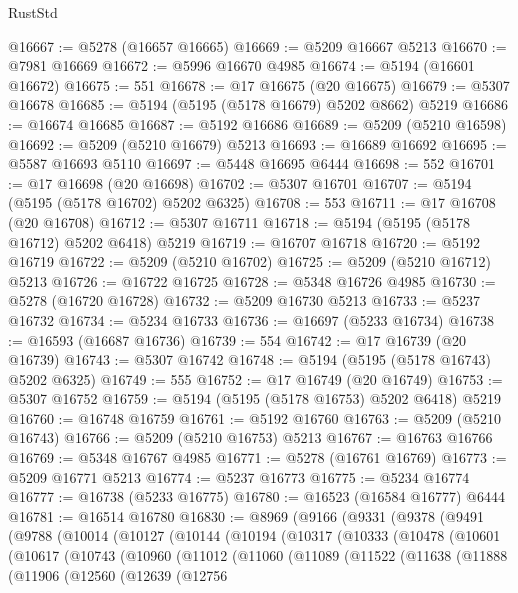 \begin{lexlean}{RustStd}
\begin{coremodule}
@16667 := @5278 (@16657 @16665)
@16669 := @5209 @16667 @5213
@16670 := @7981 @16669
@16672 := @5996 @16670 @4985
@16674 := @5194 (@16601 @16672)
@16675 := 551
@16678 := @17 @16675 (@20 @16675)
@16679 := @5307 @16678
@16685 := @5194 (@5195 (@5178 @16679) @5202 @8662) @5219
@16686 := @16674 @16685
@16687 := @5192 @16686
@16689 := @5209 (@5210 @16598)
@16692 := @5209 (@5210 @16679) @5213
@16693 := @16689 @16692
@16695 := @5587 @16693 @5110
@16697 := @5448 @16695 @6444
@16698 := 552
@16701 := @17 @16698 (@20 @16698)
@16702 := @5307 @16701
@16707 := @5194 (@5195 (@5178 @16702) @5202 @6325)
@16708 := 553
@16711 := @17 @16708 (@20 @16708)
@16712 := @5307 @16711
@16718 := @5194 (@5195 (@5178 @16712) @5202 @6418) @5219
@16719 := @16707 @16718
@16720 := @5192 @16719
@16722 := @5209 (@5210 @16702)
@16725 := @5209 (@5210 @16712) @5213
@16726 := @16722 @16725
@16728 := @5348 @16726 @4985
@16730 := @5278 (@16720 @16728)
@16732 := @5209 @16730 @5213
@16733 := @5237 @16732
@16734 := @5234 @16733
@16736 := @16697 (@5233 @16734)
@16738 := @16593 (@16687 @16736)
@16739 := 554
@16742 := @17 @16739 (@20 @16739)
@16743 := @5307 @16742
@16748 := @5194 (@5195 (@5178 @16743) @5202 @6325)
@16749 := 555
@16752 := @17 @16749 (@20 @16749)
@16753 := @5307 @16752
@16759 := @5194 (@5195 (@5178 @16753) @5202 @6418) @5219
@16760 := @16748 @16759
@16761 := @5192 @16760
@16763 := @5209 (@5210 @16743)
@16766 := @5209 (@5210 @16753) @5213
@16767 := @16763 @16766
@16769 := @5348 @16767 @4985
@16771 := @5278 (@16761 @16769)
@16773 := @5209 @16771 @5213
@16774 := @5237 @16773
@16775 := @5234 @16774
@16777 := @16738 (@5233 @16775)
@16780 := @16523 (@16584 @16777) @6444
@16781 := @16514 @16780
@16830 := @8969
    (@9166
      (@9331
        (@9378
          (@9491
            (@9788
              (@10014
                (@10127
                  (@10144
                    (@10194
                      (@10317
                        (@10333
                          (@10478
                            (@10601
                              (@10617
                                (@10743
                                  (@10960
                                    (@11012
                                      (@11060
                                        (@11089
                                          (@11522
                                            (@11638
                                              (@11888
                                                (@11906
                                                  (@12560
                                                    (@12639
                                                      (@12756

\end{coremodule}
\end{lexlean}
